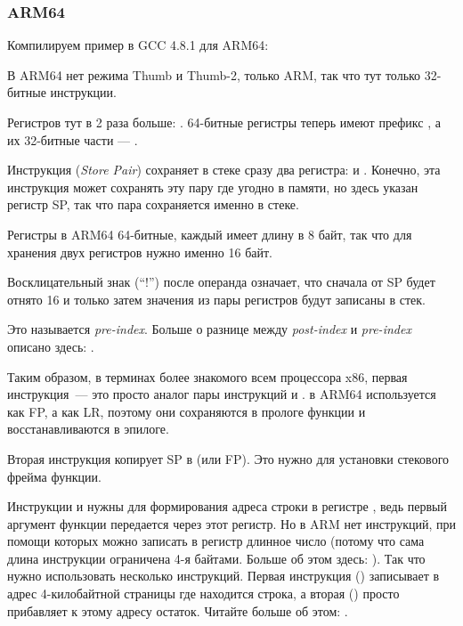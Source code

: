 \subsubsection{ARM64}


Компилируем пример в GCC 4.8.1 для ARM64:



В ARM64 нет режима Thumb и Thumb-2, только ARM, так что тут только 32-битные инструкции.

Регистров тут в 2 раза больше: .
64-битные регистры теперь имеют префикс 
, а их 32-битные части --- .

Инструкция  (\emph{Store Pair}) 
сохраняет в стеке сразу два регистра:  и .
Конечно, эта инструкция может сохранять эту пару где угодно в памяти, но здесь указан регистр \ac{SP}, так что
пара сохраняется именно в стеке.

Регистры в ARM64 64-битные, каждый имеет длину в 8 байт, так что для хранения двух регистров нужно именно 16 байт.

Восклицательный знак (``!'') после операнда означает, что сначала от \ac{SP} будет отнято 16 и только затем
значения из пары регистров будут записаны в стек.

Это называется \emph{pre-index}.
Больше о разнице между \emph{post-index} и \emph{pre-index} 
описано здесь: .

Таким образом, в терминах более знакомого всем процессора x86, первая инструкция~--- это просто аналог 
пары инструкций  и .
 в ARM64 используется как \ac{FP}, а  
как \ac{LR}, поэтому они сохраняются в прологе функции и
восстанавливаются в эпилоге.

Вторая инструкция копирует \ac{SP} в  (или \ac{FP}).
Это нужно для установки стекового фрейма функции.

\label{pointers_ADRP_and_ADD}
Инструкции  и \ADD нужны для формирования адреса строки  в регистре , 
ведь первый аргумент функции передается через этот регистр.
Но в ARM нет инструкций, при помощи которых можно записать в регистр длинное число 
(потому что сама длина инструкции ограничена 4-я байтами. Больше об этом здесь: ).
Так что нужно использовать несколько инструкций.
Первая инструкция () записывает в  адрес 4-килобайтной страницы где находится строка, 
а вторая (\ADD) просто прибавляет к этому адресу остаток.
Читайте больше об этом: .

